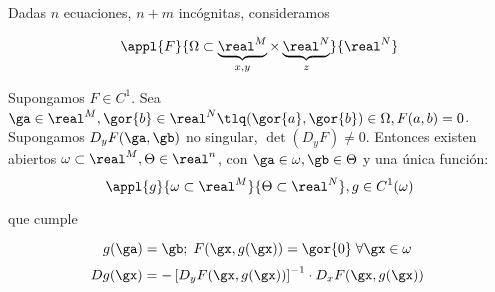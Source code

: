 \documentclass{apuntes}
\begin{document}
\begin{theorem} \label{thmFImp} Dadas $n$ ecuaciones, $n+m$ incógnitas, consideramos

$$\appl{F}{\Omega\subset\underbrace{\real^M}_{x,y} \times \underbrace{\real^N}_{z}}{\real^N}$$

Supongamos $F\in C^1$. Sea $\ga \in \real^M, \gor{b} \in \real^N \tlq (\gor{a},\gor{b})\in \Omega , F(a,b)=0$. Supongamos $D_yF(\ga,\gb)$ no singular, $\det(D_yF)\neq 0$. Entonces existen abiertos $\omega \subset \real^M, \Theta \in\real^n$, con $\ga \in \omega, \gb \in \Theta$ y una única función: \[ \appl{g}{\omega\subset\real^M}{\Theta \subset\real^N}, g\in C^1(\omega) \]

que cumple

\[ g(\ga) = \gb;\; F(\gx,g(\gx)) = \gor{0}\; \forall \gx \in \omega \]
\[ Dg(\gx) = - \left[D_yF(\gx,g(\gx))\right]^{-1} \cdot D_xF(\gx,g(\gx)) \]
\end{theorem}

\printindex
\end{document}
